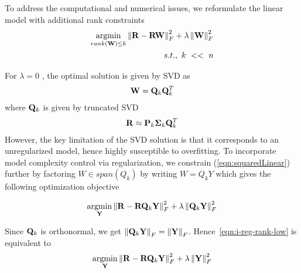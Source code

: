 To address the computational and numerical issues, we reformulate the linear model with additional rank constraints  
\begin{align}
\label{eqn:reg-rank}
\begin{split}
\underset{rank(\mathbf{W}) \le k}{\mathrm{argmin}}  \left \| \mathbf{R} - \mathbf{R}\mathbf{W}\right \|_F^2 + \lambda \left \|  \mathbf{W} \right \|_F^2 \\
s.t.,\ k\ <<\ n 
\end{split}
\end{align}


For $\lambda = 0$ , the optimal solution is given by SVD as
   \begin{align}
   \label{eqn:SVDOptimal}
   \mathbf{W} = \mathbf{Q}_k \mathbf{Q}_k^ T
   \end{align}
where  $\mathbf{Q}_k$ is given by truncated SVD 
   \begin{align*}
   \mathbf{R} \approx \mathbf{P}_k \mathbf{\Sigma}_k \mathbf{Q}_k^T
   \end{align*}
However, the key limitation of the SVD solution is that it corresponds to an unregularized model, hence highly susceptible to overfitting. To incorporate model complexity control via regularization, we constrain (\ref{eqn:squaredLinear}) further by factoring $W\in span(Q_k)$ by writing $W = Q_k Y$ which gives the following optimization objective

\begin{align}
\label{eqn:i-reg-rank-low}
\underset{\mathbf{Y}} {\mathrm{argmin}}  \left \| \mathbf{R} - \mathbf{R} \mathbf{Q}_k \mathbf{Y} \right \|_F^2 + \lambda \left \|  \mathbf{Q}_k \mathbf{Y} \right \|_F^2 
\end{align}

Since $\mathbf{Q}_k$ is orthonormal, we get $\left \| \mathbf{Q}_k \mathbf{Y} \right \|_F = \left \|\mathbf{Y}\right \|_F$. Hence~\ref{eqn:i-reg-rank-low} is equivalent to 
\begin{align}
\underset{\mathbf{Y}}{\mathrm{argmin}} \left \| \mathbf{R} - \mathbf{R}\mathbf{Q}_k\mathbf{Y}\right \|_F^2 + \lambda \left \|  \mathbf{Y} \right \|_F^2 
\end{align}

